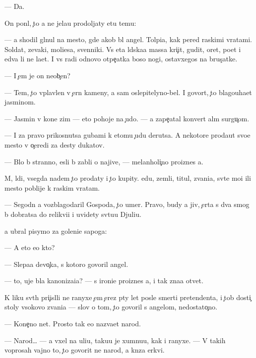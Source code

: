 \documentclass[10pt]{book}
\begin{document}
— Da.

On pon{\ia}l, {\c}to {\y}a ne jela{\y}u prodoljaty etu temu:

— {\Y}a shodil gl{\ia}nul na mesto, gde {\y}akob{\yi} b{\yi}l angel. Tolpi{\x}a, kak pered ra{\y}skimi vratami. Soldat{\yi}, zevaki, mol{\ia}{\x}i{\y}esa, sv{\ia}{\x}enniki. Vs{\ia} eta l{\iu}dska{\y}a massa kri{\c}it, gudit, oret, po{\y}et i {\y}edva li ne la{\y}et. I vs{\e} radi odnovo otpe{\c}atka boso{\y} nogi, ostavxegos{\ia} na brus{\c}atke.

— I {\c}em je on neob{\yi}{\c}en?

— Tem, {\c}to vplavlen v {\c}ern{\yi}{\y} kameny, a sam oslepitelyno-bel. I govor{\ia}t, {\c}to blagouha{\y}et jasminom.

— Jasmin v kon{\q}e zim{\yi} — eto pohoje na {\c}udo. — {\Y}a zape{\c}atal konvert al{\yi}m surgu{\c}om.

— I za pravo prikosnutsa gubami k etomu {\c}udu derutsa. A nekotor{\yi}{\y}e proda{\y}ut svo{\y}e mesto v o{\c}eredi za des{\ia}ty dukatov.

— B{\yi}lo b{\yi} stranno, {\y}esli b{\yi} zab{\yi}li o najive, — melanholi{\c}no proiznes {\y}a.

M{\yi}, l{\iu}di, vsegda na{\y}dem {\c}to prodaty i {\c}to kupity. {\Y}edu, zemli, titul{\yi}, zvani{\y}a, sv{\ia}t{\yi}{\y}e mo{\x}i ili mesto poblije k ra{\y}skim vratam.

— Segodn{\ia} {\y}a vozblagodaril Gospoda, {\c}to umer. Pravo, budy {\y}a jiv, {\c}erta s dva smog b{\yi} dobratsa do relikvi{\y}i i uvidety sv{\ia}tu{\y}u Djuli{\y}u.

{\Y}a ubral pisymo za goleni{\x}e sapoga:

— A eto {\y}e{\x}o kto?

— Slepa{\y}a devo{\c}ka, s kotoro{\y} govoril angel.

— {\C}to, uje b{\yi}la kanoniza{\q}i{\y}a? — s ironi{\y}e{\y} proiznes {\y}a, i tak zna{\y}a otvet.

K liku sv{\ia}t{\yi}h pri{\c}isl{\ia}li ne ranyxe {\c}em {\c}erez p{\ia}ty let posle smerti pretendenta, i {\c}tob{\yi} dosti{\c} stoly v{\yi}sokovo zvani{\y}a — slov o tom, {\c}to govoril s angelom, nedostato{\c}no.

— Kone{\c}no net. Prosto tak {\y}e{\y}o naz{\yi}va{\y}et narod.

— Narod… — {\Y}a v{\yi}xel na uli{\q}u, taku{\y}u je xumnu{\y}u, kak i ranyxe. — V takih voprosah vajno to, {\c}to govorit ne narod, a kn{\ia}z{\y}a {\q}erkvi.
\end{document}
